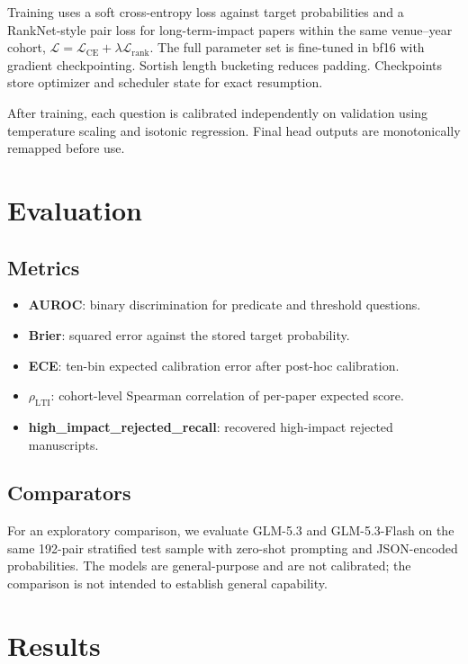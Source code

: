 \documentclass[11pt]{article}
\begin{document}
Training uses a soft cross-entropy loss against target probabilities and a
RankNet-style pair loss for long-term-impact papers within the same
venue--year cohort,
\(
  \mathcal{L}=\mathcal{L}_{\mathrm{CE}}+\lambda\mathcal{L}_{\mathrm{rank}}.
\)
The full parameter set is fine-tuned in bf16 with gradient checkpointing.
Sortish length bucketing reduces padding. Checkpoints store optimizer and
scheduler state for exact resumption.

After training, each question is calibrated independently on validation using
temperature scaling and isotonic regression. Final head outputs are
monotonically remapped before use.

\section{Evaluation}

\subsection{Metrics}

\begin{itemize}
  \item \textbf{AUROC}: binary discrimination for predicate and threshold
        questions.
  \item \textbf{Brier}: squared error against the stored target probability.
  \item \textbf{ECE}: ten-bin expected calibration error after post-hoc
        calibration.
  \item \(\rho_{\mathrm{LTI}}\): cohort-level Spearman correlation of per-paper
        expected score.
  \item \textbf{high\_impact\_rejected\_recall}: recovered high-impact rejected
        manuscripts.
\end{itemize}

\subsection{Comparators}

For an exploratory comparison, we evaluate GLM-5.3 and GLM-5.3-Flash on the
same 192-pair stratified test sample with zero-shot prompting and JSON-encoded
probabilities. The models are general-purpose and are not calibrated; the
comparison is not intended to establish general capability.

\section{Results}
\end{document}
